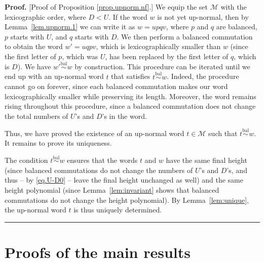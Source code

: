 \documentclass[numbers=enddot,12pt,final,onecolumn,notitlepage]{scrartcl}%
\theoremstyle{definition}
\newenvironment{proof}[1][Proof]{\noindent\textbf{#1.} }{\ \rule{0.5em}{0.5em}}
\newcommand{\M}{\mathcal{M}}
\newcommand{\balsim}{\overset{\operatorname*{bal}}{\sim}}
\begin{document}
\begin{proof}
[Proof of Proposition \ref{prop.upnorm.nf}.]
We equip the set $\M$ with the lexicographic order, where $D<U$.
If the word $w$ is not yet up-normal, then by Lemma~\ref{lem.upnorm.1} we can write it as $w = upqv$, where $p$ and $q$ are balanced, $p$ starts with $U$, and $q$ starts with $D$.
We then perform a balanced commutation to obtain the word $w' = uqpv$, which is lexicographically smaller than $w$ (since the first letter of $p$, which was $U$, has been replaced by the first letter of $q$, which is $D$).
We have $w' \balsim w$ by construction.
This procedure can be iterated until we end up with an up-normal word $t$ that satisfies $t \balsim w$. Indeed, the procedure cannot go on forever, since each balanced commutation makes our word lexicographically smaller while preserving its length.
Moreover, the word remains rising throughout this procedure, since a balanced commutation does not change the total numbers of $U$'s and $D$'s in the word.

Thus, we have proved the existence of an up-normal word $t \in \M$ such that $t \balsim w$.
It remains to prove its uniqueness.

The condition $t \balsim w$ ensures that the words $t$ and $w$ have the same final height (since balanced commutations do not change the numbers of $U$'s and $D$'s, and thus -- by \eqref{eq.U-D0} -- leave the final height unchanged as well) and the same height polynomial (since Lemma~\ref{lem:invariant} shows that balanced commutations do not change the height polynomial).
By Lemma~\ref{lem:unique}, the up-normal word $t$ is thus uniquely determined.
\end{proof}

\section{Proofs of the main results}\label{sec:mainproofs}
\end{document}
